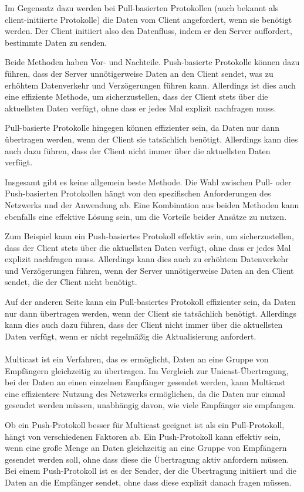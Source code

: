 \documentclass[../vs-script-first-v01.tex]{subfiles}
\begin{document}
Im Gegensatz dazu werden bei Pull-basierten Protokollen (auch bekannt als client-initiierte Protokolle) die Daten vom Client angefordert, wenn sie benötigt werden. Der Client initiiert also den Datenfluss, indem er den Server auffordert, bestimmte Daten zu senden.

Beide Methoden haben Vor- und Nachteile. Push-basierte Protokolle können dazu führen, dass der Server unnötigerweise Daten an den Client sendet, was zu erhöhtem Datenverkehr und Verzögerungen führen kann. Allerdings ist dies auch eine effiziente Methode, um sicherzustellen, dass der Client stets über die aktuellsten Daten verfügt, ohne dass er jedes Mal explizit nachfragen muss.

Pull-basierte Protokolle hingegen können effizienter sein, da Daten nur dann übertragen werden, wenn der Client sie tatsächlich benötigt. Allerdings kann dies auch dazu führen, dass der Client nicht immer über die aktuellsten Daten verfügt.

Insgesamt gibt es keine allgemein beste Methode. Die Wahl zwischen Pull- oder Push-basierten Protokollen hängt von den spezifischen Anforderungen des Netzwerks und der Anwendung ab. Eine Kombination aus beiden Methoden kann ebenfalls eine effektive Lösung sein, um die Vorteile beider Ansätze zu nutzen.

Zum Beispiel kann ein Push-basiertes Protokoll effektiv sein, um sicherzustellen, dass der Client stets über die aktuellsten Daten verfügt, ohne dass er jedes Mal explizit nachfragen muss. Allerdings kann dies auch zu erhöhtem Datenverkehr und Verzögerungen führen, wenn der Server unnötigerweise Daten an den Client sendet, die der Client nicht benötigt.

Auf der anderen Seite kann ein Pull-basiertes Protokoll effizienter sein, da Daten nur dann übertragen werden, wenn der Client sie tatsächlich benötigt. Allerdings kann dies auch dazu führen, dass der Client nicht immer über die aktuellsten Daten verfügt, wenn er nicht regelmäßig die Aktualisierung anfordert.
\\\\
Multicast ist ein Verfahren, das es ermöglicht, Daten an eine Gruppe von Empfängern gleichzeitig zu übertragen. Im Vergleich zur Unicast-Übertragung, bei der Daten an einen einzelnen Empfänger gesendet werden, kann Multicast eine effizientere Nutzung des Netzwerks ermöglichen, da die Daten nur einmal gesendet werden müssen, unabhängig davon, wie viele Empfänger sie empfangen.

Ob ein Push-Protokoll besser für Multicast geeignet ist als ein Pull-Protokoll, hängt von verschiedenen Faktoren ab. Ein Push-Protokoll kann effektiv sein, wenn eine große Menge an Daten gleichzeitig an eine Gruppe von Empfängern gesendet werden soll, ohne dass diese die Übertragung aktiv anfordern müssen. Bei einem Push-Protokoll ist es der Sender, der die Übertragung initiiert und die Daten an die Empfänger sendet, ohne dass diese explizit danach fragen müssen.
\end{document}
